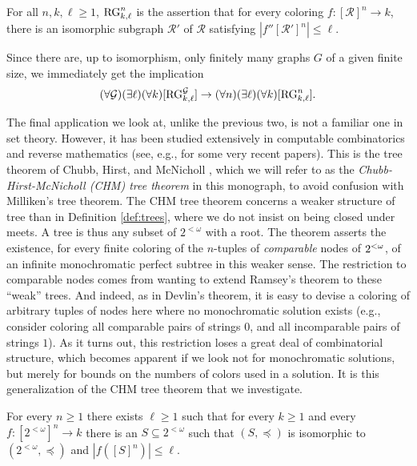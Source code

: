 \begin{statement}
For all $n,k,\ell \geq 1$, $\mathrm{RG}^n_{k,\ell}$ is the assertion that for every coloring $f: [\mathcal{R}]^n \to k$, there is an isomorphic subgraph $\mathcal{R}'$ of $\mathcal{R}$ satisfying $|f''[\mathcal{R}']^n| \leq \ell$.
\end{statement}

\noindent Since there are, up to isomorphism, only finitely many graphs $G$ of a given finite size, we immediately get the implication
\[
	(\forall \mathcal{G})(\exists \ell)(\forall k)[\mathrm{RG}^\mathcal{G}_{k,\ell}] \to (\forall n)(\exists \ell)(\forall k)[\mathrm{RG}^n_{k,\ell}].
\]

The final application we look at, unlike the previous two, is not a familiar one in set theory. However, it has been studied extensively in computable combinatorics and reverse mathematics (see, e.g., \cite{Chong2019Strengtha, Chong2019Strengthb, Chong2019Strengthc, Dzhafarov2017Coloring, Patey2016strength} for some very recent papers). This is the tree theorem of Chubb, Hirst, and McNicholl \cite{Chubb2009Reverse}, which we will refer to as the \emph{Chubb-Hirst-McNicholl (CHM) tree theorem} in this monograph, to avoid confusion with Milliken's tree theorem. The CHM tree theorem concerns a weaker structure of tree than in Definition \ref{def:trees}, where we do not insist on being closed under meets. A tree is thus any subset of $2^{<\omega}$ with a root. The theorem asserts the existence, for every finite coloring of the $n$-tuples of \emph{comparable} nodes of ${2^{<\omega}}$, of an infinite monochromatic perfect subtree in this weaker sense. The restriction to comparable nodes comes from wanting to extend Ramsey's theorem to these ``weak'' trees. And indeed, as in Devlin's theorem, it is easy to devise a coloring of arbitrary tuples of nodes here where no monochromatic solution exists (e.g., consider coloring all comparable pairs of strings $0$, and all incomparable pairs of strings $1$). As it turns out, this restriction loses a great deal of combinatorial structure, which becomes apparent if we look not for monochromatic solutions, but merely for bounds on the numbers of colors used in a solution. It is this generalization of the CHM tree theorem that we investigate.

\begin{theorem}
	For every $n \geq 1$ there exists $\ell \geq 1$ such that for every $k \geq 1$ and every $f: [2^{<\omega}]^n \to k$ there is an $S \subseteq 2^{<\omega}$ such that $(S,\preceq)$ is isomorphic to $(2^{<\omega},\preceq)$ and $|f ([S]^n)| \leq \ell$.
\end{theorem}

